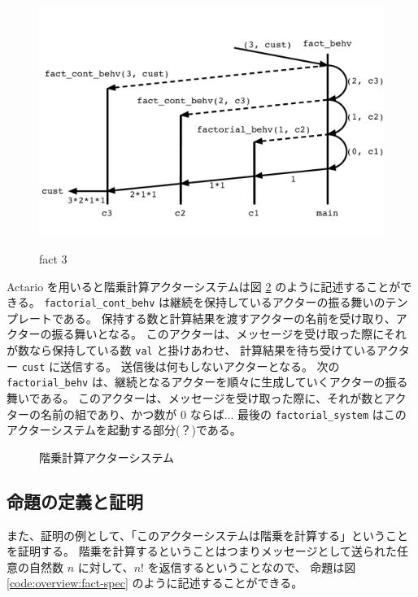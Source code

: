 \begin{figure}[tp]
  \includegraphics[width=14cm]{./img/overview/fact.pdf}
  \label{img:overview:fact}
  \caption{fact 3}
\end{figure}

Actario を用いると階乗計算アクターシステムは図 \ref{code:overview:fact-impl} のように記述することができる。
\texttt{factorial\_cont\_behv} は継続を保持しているアクターの振る舞いのテンプレートである。
保持する数と計算結果を渡すアクターの名前を受け取り、アクターの振る舞いとなる。
このアクターは、メッセージを受け取った際にそれが数なら保持している数 \texttt{val} と掛けあわせ、
計算結果を待ち受けているアクター \texttt{cust} に送信する。
送信後は何もしないアクターとなる。
次の \texttt{factorial\_behv} は、継続となるアクターを順々に生成していくアクターの振る舞いである。
このアクターは、メッセージを受け取った際に、それが数とアクターの名前の組であり、かつ数が $0$ ならば...
最後の \texttt{factorial\_system} はこのアクターシステムを起動する部分(？)である。

\begin{figure}[tp]
  
  \label{code:overview:fact-impl}
  \caption{階乗計算アクターシステム}
\end{figure}

\subsection{命題の定義と証明}

また、証明の例として、「このアクターシステムは階乗を計算する」ということを証明する。
階乗を計算するということはつまりメッセージとして送られた任意の自然数 $n$ に対して、$n!$ を返信するということなので、
命題は図 \ref{code:overview:fact-spec} のように記述することができる。

